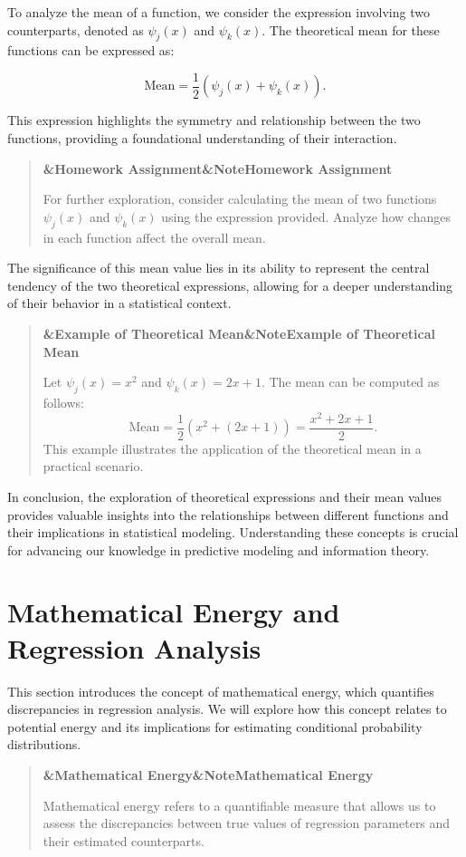 \documentclass[a4paper]{article}
\newcommand{\boxheading}[1]{%
  \par\smallskip
  \noindent\textbf{\ifx&#1&Note\else#1\fi}\par
  \smallskip
}
\newenvironment{defbox}[1][]{%
  \begin{quote}\color{green!40!black}\boxheading{#1}\normalcolor
}{\end{quote}}
\newenvironment{exbox}[1][]{%
  \begin{quote}\color{brown!70!black}\boxheading{#1}\normalcolor
}{\end{quote}}
\newenvironment{rembox}[1][]{%
  \begin{quote}\color{black!70}\boxheading{#1}\normalcolor
}{\end{quote}}
\begin{document}
To analyze the mean of a function, we consider the expression involving two counterparts, denoted as \( \psi_j(x) \) and \( \psi_k(x) \). The theoretical mean for these functions can be expressed as:

\begin{equation}
\text{Mean} = \frac{1}{2} \left( \psi_j(x) + \psi_k(x) \right).
\end{equation}

This expression highlights the symmetry and relationship between the two functions, providing a foundational understanding of their interaction.

\begin{rembox}[Homework Assignment]
For further exploration, consider calculating the mean of two functions \( \psi_j(x) \) and \( \psi_k(x) \) using the expression provided. Analyze how changes in each function affect the overall mean.
\end{rembox}

The significance of this mean value lies in its ability to represent the central tendency of the two theoretical expressions, allowing for a deeper understanding of their behavior in a statistical context.

\begin{exbox}[Example of Theoretical Mean]
Let \( \psi_j(x) = x^2 \) and \( \psi_k(x) = 2x + 1 \). The mean can be computed as follows:
\[
\text{Mean} = \frac{1}{2} \left( x^2 + (2x + 1) \right) = \frac{x^2 + 2x + 1}{2}.
\]
This example illustrates the application of the theoretical mean in a practical scenario.
\end{exbox}

In conclusion, the exploration of theoretical expressions and their mean values provides valuable insights into the relationships between different functions and their implications in statistical modeling. Understanding these concepts is crucial for advancing our knowledge in predictive modeling and information theory.

\section{Mathematical Energy and Regression Analysis}
This section introduces the concept of mathematical energy, which quantifies discrepancies in regression analysis. We will explore how this concept relates to potential energy and its implications for estimating conditional probability distributions.

\begin{defbox}[Mathematical Energy]
Mathematical energy refers to a quantifiable measure that allows us to assess the discrepancies between true values of regression parameters and their estimated counterparts.
\end{defbox}
\end{document}
